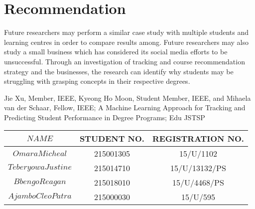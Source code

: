 \documentclass{article}
\begin{document}
\section{Recommendation}
Future researchers may perform a similar case study with multiple students and learning centres in order to compare results among. Future researchers may also study a small business which has considered its
social media efforts to be unsuccessful. Through an investigation of tracking and course recommendation strategy and the businesses, the research can identify why students may be struggling with grasping concepts in their respective degrees.

\begin{thebibliography}{9}
Jie Xu, Member, IEEE, Kyeong Ho Moon, Student Member, IEEE, and Mihaela van der Schaar, Fellow, IEEE; A Machine Learning Approach for Tracking and Predicting Student Performance in Degree Programs; Edu JSTSP

\bibitem{}{ }

\end{thebibliography}



\begin{tabular}{|c|c|c|}
	
	
\hline	$NAME$ & STUDENT NO. & REGISTRATION NO. \\ \hline
\hline	$Omara Micheal$ & 215001305 &15/U/1102 \\ \hline
\hline	$Teberyowa Justine$ &215014710 & 15/U/13132/PS \\ \hline
\hline	$Bbengo Reagan$ & 215018010 & 15/U/4468/PS \\ \hline
\hline	$Ajambo Cleo Patra$ & 215000030 & 15/U/595 \\ \hline
	
	
\end{tabular}
\end{document}
